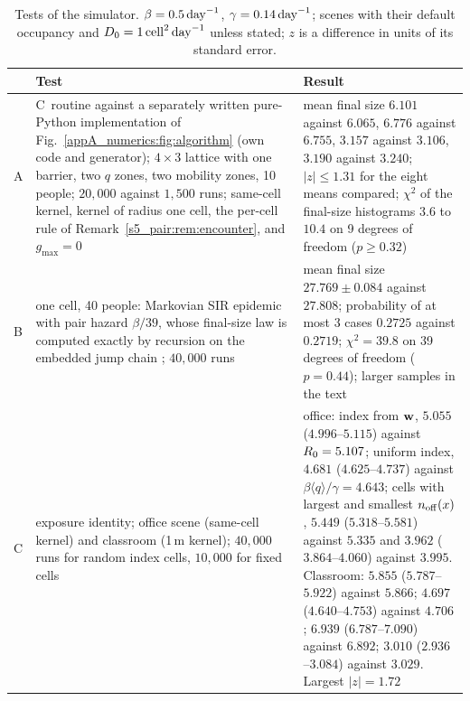 \begin{table}[tbp]
\centering
\caption{Tests of the simulator. $\beta=0.5\,\mathrm{day}^{-1}$, $\gamma=0.14\,\mathrm{day}^{-1}$; scenes with their default
occupancy and $D_0=1\,\mathrm{cell}^2\,\mathrm{day}^{-1}$ unless stated; $z$ is a difference in units of its standard error.}
\label{appA_numerics:tab:simulator}
\footnotesize
\begin{tabular}{@{}p{0.3cm}p{6.5cm}p{8.3cm}@{}}
\toprule
 & Test & Result\\
\midrule
A & C~routine against a separately written pure-Python implementation of
    Fig.~\ref{appA_numerics:fig:algorithm} (own code and generator); $4\times3$ lattice with one barrier, two
    $q$ zones, two mobility zones, 10 people; $20{,}000$ against $1{,}500$ runs; same-cell kernel, kernel of
    radius one cell, the per-cell rule of Remark~\ref{s5_pair:rem:encounter}, and $g_{\max}=0$ &
    mean final size $6.101$ against $6.065$, $6.776$ against $6.755$, $3.157$ against $3.106$, $3.190$
    against $3.240$; $|z|\le1.31$ for the eight means compared; $\chi^2$ of the final-size histograms $3.6$
    to $10.4$ on 9 degrees of freedom ($p\ge0.32$)\\
\addlinespace[3pt]
B & one cell, 40 people: Markovian SIR epidemic with pair hazard $\beta/39$, whose final-size law is computed
    exactly by recursion on the embedded jump chain \citep[cf.][]{andersson2000stochastic}; $40{,}000$ runs &
    mean final size $27.769\pm0.084$ against $27.808$; probability of at most 3 cases $0.2725$ against
    $0.2719$; $\chi^2=39.8$ on 39 degrees of freedom ($p=0.44$); larger samples in the text\\
\addlinespace[3pt]
C & exposure identity; office scene (same-cell kernel) and classroom (1\,m kernel); $40{,}000$ runs for random
    index cells, $10{,}000$ for fixed cells &
    office: index from $\mathbf{w}$, $5.055$ ($4.996$--$5.115$) against $R_0=5.107$; uniform index, $4.681$
    ($4.625$--$4.737$) against $\beta\langle q\rangle/\gamma=4.643$; cells with largest and smallest $n_{\mathrm{off}}(x)$,
    $5.449$ ($5.318$--$5.581$) against $5.335$ and $3.962$ ($3.864$--$4.060$) against $3.995$.
    Classroom: $5.855$ ($5.787$--$5.922$) against $5.866$; $4.697$ ($4.640$--$4.753$) against $4.706$; $6.939$
    ($6.787$--$7.090$) against $6.892$; $3.010$ ($2.936$--$3.084$) against $3.029$. Largest $|z|=1.72$\\

\end{tabular}
\end{table}
